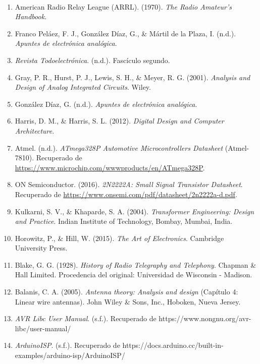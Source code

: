 \paragraph{}
\begin{enumerate}
\item American Radio Relay League (ARRL). (1970). \textit{The Radio Amateur's Handbook}.
\item Franco Peláez, F. J., González Díaz, G., \& Mártil de la Plaza, I. (n.d.). \textit{Apuntes de electrónica analógica}.
\item \textit{Revista Todoelectrónica}. (n.d.). Fascículo segundo.
\item Gray, P. R., Hurst, P. J., Lewis, S. H., \& Meyer, R. G. (2001). \textit{Analysis and Design of Analog Integrated Circuits}. Wiley.
\item González Díaz, G. (n.d.). \textit{Apuntes de electrónica analógica}.
\item Harris, D. M., \& Harris, S. L. (2012). \textit{Digital Design and Computer Architecture}. 
\item Atmel. (n.d.). \textit{ATmega328P Automotive Microcontrollers Datasheet} (Atmel-7810). Recuperado de \url{https://www.microchip.com/wwwproducts/en/ATmega328P}.
\item ON Semiconductor. (2016). \textit{2N2222A: Small Signal Transistor Datasheet}. Recuperado de \url{https://www.onsemi.com/pdf/datasheet/2n2222a-d.pdf}.
\item Kulkarni, S. V., \& Khaparde, S. A. (2004). \textit{Transformer Engineering: Design and Practice}. Indian Institute of Technology, Bombay, Mumbai, India.
\item Horowitz, P., \& Hill, W. (2015). \textit{The Art of Electronics}. Cambridge University Press.
\item {Blake, G. G. (1928). \textit{History of Radio Telegraphy and Telephony}. Chapman \& Hall Limited. Procedencia del original: Universidad de Wisconsin - Madison.}
\item Balanis, C. A. (2005). \textit{Antenna theory: Analysis and design} (Capítulo 4: Linear wire antennas). John Wiley \& Sons, Inc., Hoboken, Nueva Jersey.
\item \textit{AVR Libc User Manual}. (s.f.). Recuperado de https://www.nongnu.org/avr-libc/user-manual/
\item \textit{ArduinoISP}. (s.f.). Recuperado de https://docs.arduino.cc/built-in-examples/arduino-isp/ArduinoISP/
\end{enumerate}
